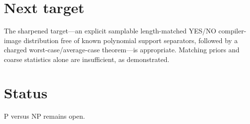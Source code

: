 \documentclass[11pt]{article}
\begin{document}
\section{Next target}
The sharpened target---an explicit samplable length-matched YES/NO compiler-image distribution free of known polynomial support separators, followed by a charged worst-case/average-case theorem---is appropriate. Matching priors and coarse statistics alone are insufficient, as demonstrated.

\section{Status}
P versus NP remains open.

\end{document}
